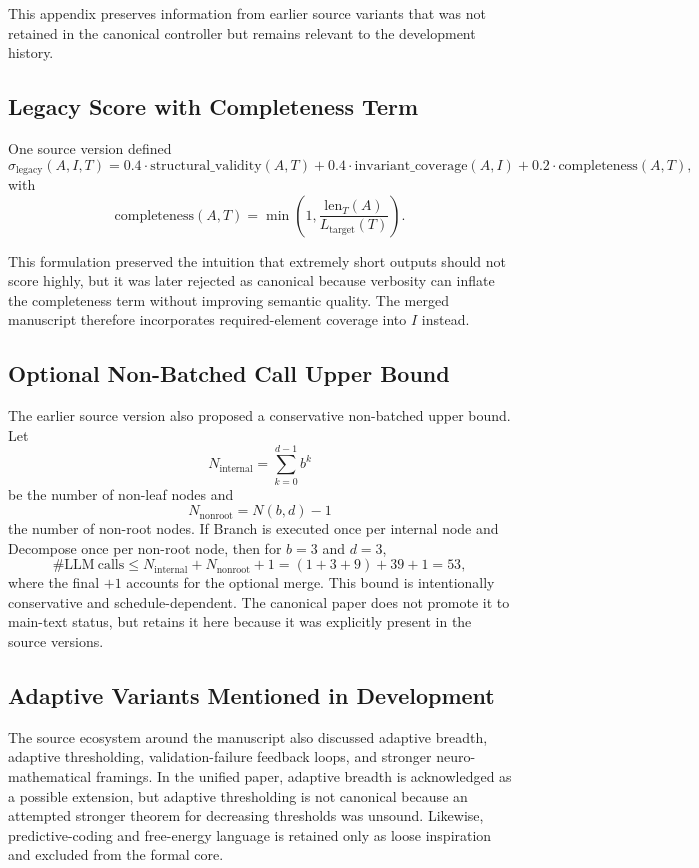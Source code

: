 \documentclass[11pt,a4paper]{article}
\numberwithin{equation}{section}
\theoremstyle{definition}
\begin{document}
This appendix preserves information from earlier source variants that was not retained in the canonical controller but remains relevant to the development history.

\subsection{Legacy Score with Completeness Term}

One source version defined
\[
\sigma_{\mathrm{legacy}}(A,I,T)
=
0.4\cdot \text{structural\_validity}(A,T)
+
0.4\cdot \text{invariant\_coverage}(A,I)
+
0.2\cdot \text{completeness}(A,T),
\]
with
\[
\text{completeness}(A,T)
=
\min\left(1,\frac{\mathrm{len}_T(A)}{L_{\mathrm{target}}(T)}\right).
\]

This formulation preserved the intuition that extremely short outputs should not score highly, but it was later rejected as canonical because verbosity can inflate the completeness term without improving semantic quality. The merged manuscript therefore incorporates required-element coverage into \(I\) instead.

\subsection{Optional Non-Batched Call Upper Bound}

The earlier source version also proposed a conservative non-batched upper bound. Let
\[
N_{\mathrm{internal}}=\sum_{k=0}^{d-1}b^k
\]
be the number of non-leaf nodes and
\[
N_{\mathrm{nonroot}}=N(b,d)-1
\]
the number of non-root nodes. If Branch is executed once per internal node and Decompose once per non-root node, then for \(b=3\) and \(d=3\),
\[
\#\mathrm{LLM\ calls}
\le N_{\mathrm{internal}}+N_{\mathrm{nonroot}}+1
=
(1+3+9)+39+1
=
53,
\]
where the final \(+1\) accounts for the optional merge. This bound is intentionally conservative and schedule-dependent. The canonical paper does not promote it to main-text status, but retains it here because it was explicitly present in the source versions.

\subsection{Adaptive Variants Mentioned in Development}

The source ecosystem around the manuscript also discussed adaptive breadth, adaptive thresholding, validation-failure feedback loops, and stronger neuro-mathematical framings. In the unified paper, adaptive breadth is acknowledged as a possible extension, but adaptive thresholding is not canonical because an attempted stronger theorem for decreasing thresholds was unsound. Likewise, predictive-coding and free-energy language is retained only as loose inspiration and excluded from the formal core.
\end{document}
